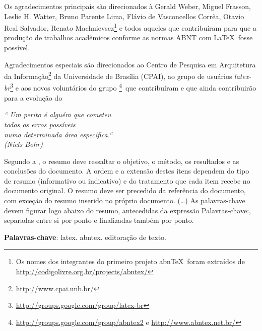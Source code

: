 \documentclass[
	12pt,			%
	openany,			%
	oneside,			%
	a4paper,			%
	english,			%
	french,				%
	spanish,			%
	brazil				%
	]{abntex2}
\begin{document}
\begin{agradecimentos}
Os agradecimentos principais são direcionados à Gerald Weber, Miguel Frasson,
Leslie H. Watter, Bruno Parente Lima, Flávio de Vasconcellos Corrêa, Otavio Real
Salvador, Renato Machnievscz\footnote{Os nomes dos integrantes do primeiro
projeto abn\TeX\ foram extraídos de
\url{http://codigolivre.org.br/projects/abntex/}} e todos aqueles que
contribuíram para que a produção de trabalhos acadêmicos conforme
as normas ABNT com \LaTeX\ fosse possível.

Agradecimentos especiais são direcionados ao Centro de Pesquisa em Arquitetura
da Informação\footnote{\url{http://www.cpai.unb.br/}} da Universidade de
Brasília (CPAI), ao grupo de usuários
\emph{latex-br}\footnote{\url{http://groups.google.com/group/latex-br}} e aos
novos voluntários do grupo
\emph{\abnTeX}\footnote{\url{http://groups.google.com/group/abntex2} e
\url{http://www.abntex.net.br/}}~que contribuíram e que ainda
contribuirão para a evolução do \abnTeX
\end{agradecimentos}



\newpage
\vspace*{\fill}
\begin{flushright}
	\textit{``
		Um perito é alguém que cometeu \\ todos os erros possíveis\\
		numa determinada área específica.`` \\
		(Niels Bohr)}
\end{flushright}
\newpage


\setlength{\absparsep}{18pt} %
\begin{resumo}
 Segundo a , o resumo deve ressaltar o
 objetivo, o método, os resultados e as conclusões do documento. A ordem e a extensão
 destes itens dependem do tipo de resumo (informativo ou indicativo) e do
 tratamento que cada item recebe no documento original. O resumo deve ser
 precedido da referência do documento, com exceção do resumo inserido no
 próprio documento. (\ldots) As palavras-chave devem figurar logo abaixo do
 resumo, antecedidas da expressão Palavras-chave:, separadas entre si por
 ponto e finalizadas também por ponto.

 \textbf{Palavras-chave}: latex. abntex. editoração de texto.
\end{resumo}
\end{document}
